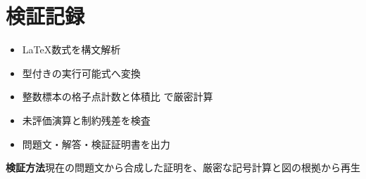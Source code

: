 \documentclass[uplatex,dvipdfmx,11pt]{jsarticle}
\begin{document}
\section*{検証記録}
\begin{itemize}
\item LaTeX数式を構文解析
\item 型付きの実行可能式へ変換
\item 整数標本の格子点計数と体積比 で厳密計算
\item 未評価演算と制約残差を検査
\item 問題文・解答・検証証明書を出力
\end{itemize}
\noindent\textbf{検証方法}\quad 現在の問題文から合成した証明を、厳密な記号計算と図の根拠から再生
\par{}
\end{document}
